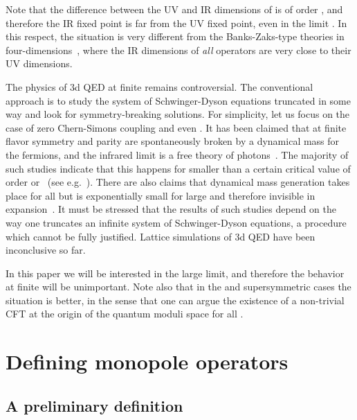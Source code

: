\documentclass[a4paper,12pt, amsfonts, amssymb]{article}
\providecommand{\ra}{\rightarrow}
\begin{document}
Note that the difference between the UV and IR dimensions of \coordHE{}
is of order \coordHE{}, and therefore the IR fixed point is far from the UV
fixed point, even in the limit \myHighlight{$N_f\ra\infty$}\coordHE{}. In this respect,
the situation is very different from the Banks-Zaks-type theories
in four-dimensions~\cite{BZ}, where the IR dimensions of {\it all} operators are very close to their UV dimensions.

The physics of 3d QED at finite \coordHE{} remains controversial. The conventional
approach is to study the system of Schwinger-Dyson equations truncated 
in some way and look for symmetry-breaking solutions. For simplicity,
let us focus on the case of zero Chern-Simons coupling and even \coordHE{}.
It has been claimed that at finite \coordHE{} flavor symmetry and parity are spontaneously broken by a dynamical mass for the fermions, and the infrared limit is a free theory of photons~\cite{Pisarski}. The majority of such studies indicate that this happens for \coordHE{} smaller than a certain critical value of order \coordHE{} or \coordHE{}~(see e.g.~\cite{ANW,Nash,Maris}).
There are also claims that dynamical mass 
generation takes place for all \coordHE{} but is exponentially small for large
\coordHE{} and therefore invisible in \coordHE{} expansion~\cite{Pisarski,PW,CPW}.
It must be stressed that the results of such studies depend on the way one truncates an infinite system of Schwinger-Dyson equations, a procedure which 
cannot be fully justified. Lattice simulations of 3d QED have been
inconclusive so far. 

In this paper we will be
interested in the large \coordHE{} limit, and therefore the behavior at
finite \coordHE{} will be unimportant. Note also that in the \coordHE{} and \coordHE{}
supersymmetric cases the situation is better, in the sense that one can argue
the existence of a non-trivial CFT at the origin of the quantum moduli
space for all \coordHE{}. 

\section{Defining monopole operators}

\subsection{A preliminary definition}
\end{document}
